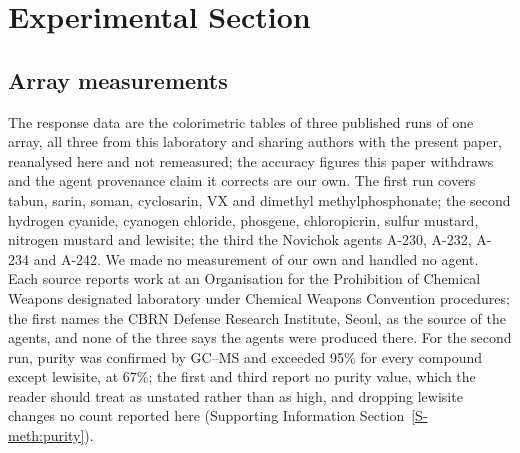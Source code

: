 \documentclass[journal=jacsat,manuscript=article,margin=1in]{achemso}
\begin{document}
\section{Experimental Section}

\subsection{Array measurements}
\label{meth:array}
The response data are the colorimetric tables of three published runs of one
array, all three from this laboratory and sharing authors with the present
paper, reanalysed here and not remeasured; the accuracy figures this paper
withdraws and the agent provenance claim it corrects are our own. The first run
covers tabun, sarin, soman, cyclosarin, VX and dimethyl
methylphosphonate;\cite{hazref} the second hydrogen cyanide, cyanogen chloride,
phosgene, chloropicrin, sulfur mustard, nitrogen mustard and
lewisite;\cite{multiplexref} the third the Novichok agents A-230, A-232, A-234
and A-242.\cite{group3ref} We made no measurement of our own and handled no
agent. Each source reports work at an Organisation for the Prohibition of
Chemical Weapons designated laboratory under Chemical Weapons Convention
procedures; the first names the CBRN Defense Research Institute, Seoul, as the
source of the agents, and none of the three says the agents were produced
there. For the second run, purity was confirmed by GC--MS and exceeded 95\% for
every compound except lewisite, at 67\%;\cite{multiplexref} the first and third
report no purity value, which the reader should treat as unstated rather than
as high, and dropping lewisite changes no count reported here (Supporting
Information Section~\ref{S-meth:purity}).
\end{document}
